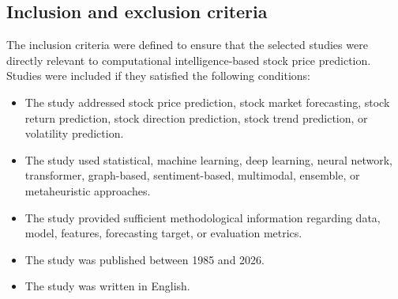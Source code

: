 \documentclass[pdflatex,sn-mathphys-num]{sn-jnl}%
\theoremstyle{thmstyleone}%
\theoremstyle{thmstyletwo}%
\theoremstyle{thmstylethree}%
\newcommand{\SuppFileOne}
  {Supplementary File~1}
\newcommand{\SuppSecSearch}
  {\SuppFileOne, Section~S2}
\begin{document}



\subsection{Inclusion and exclusion criteria}

The inclusion criteria were defined to ensure that the selected studies were directly relevant to computational intelligence-based stock price prediction. Studies were included if they satisfied the following conditions:

\begin{itemize}
    \item The study addressed stock price prediction, stock market forecasting, stock return prediction, stock direction prediction, stock trend prediction, or volatility prediction.
    \item The study used statistical, machine learning, deep learning, neural network, transformer, graph-based, sentiment-based, multimodal, ensemble, or metaheuristic approaches.
    \item The study provided sufficient methodological information regarding data, model, features, forecasting target, or evaluation metrics.
    \item The study was published between 1985 and 2026.
    \item The study was written in English.
\end{itemize}
\end{document}
